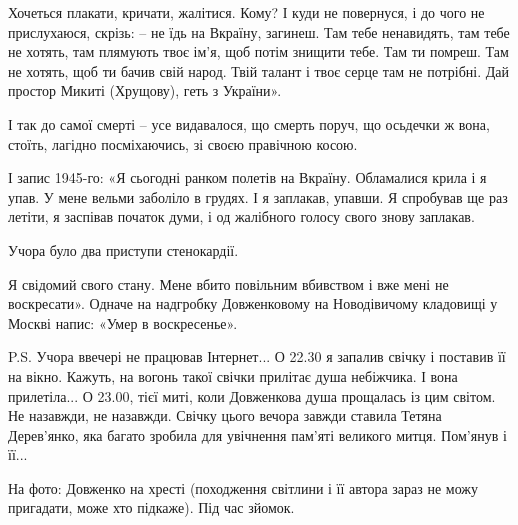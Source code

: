 Хочеться плакати, кричати, жалітися. Кому? І куди не повернуся, і до чого не
прислухаюся, скрізь: – не їдь на Вкраїну, загинеш. Там тебе ненавидять, там
тебе не хотять, там плямують твоє ім'я, щоб потім знищити тебе. Там ти помреш.
Там не хотять, щоб ти бачив свій народ. Твій талант і твоє серце там не
потрібні. Дай простор Микиті (Хрущову), геть з України». 

І так до самої смерті – усе видавалося, що смерть поруч, що  осьдечки ж вона,
стоїть, лагідно посміхаючись, зі своєю правічною косою. 

І запис 1945-го: «Я сьогодні ранком полетів на Вкраїну. Обламалися крила і я
упав. У мене вельми заболіло в грудях. І я заплакав, упавши. Я спробував ще раз
летіти, я заспівав початок думи, і од жалібного голосу свого знову заплакав.

Учора було два приступи стенокардії.

Я свідомий свого стану. Мене вбито повільним вбивством і вже мені не
воскресати». Одначе на надгробку Довженковому на Новодівичому кладовищі у
Москві напис: «Умер в воскресенье». 

P.S. Учора ввечері не працював Інтернет... О 22.30 я запалив свічку і поставив
її на вікно. Кажуть, на вогонь такої свічки прилітає душа небіжчика. І вона
прилетіла... О 23.00, тієї миті, коли Довженкова душа прощалась із цим світом.
Не назавжди, не назавжди. Свічку цього вечора завжди ставила Тетяна Дерев'янко,
яка багато зробила для увічнення пам'яті великого митця. Пом'янув і її...

На фото: Довженко на хресті (походження світлини і її автора зараз не можу
пригадати, може хто підкаже). Під час зйомок.


